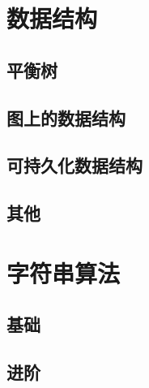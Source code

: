 \documentclass[12pt,a4paper,titlepage]{article}
\begin{document}
    
    

\section{\LARGE 数据结构}
	\subsection{平衡树}
    
    
    
	

	\subsection{图上的数据结构}
	
    

	\subsection{可持久化数据结构}
	
    

	\subsection{其他}
	

\section{\LARGE 字符串算法}
	\subsection{基础}
	
    
    
    
    

	\subsection{进阶}
    
    
	
\end{document}
